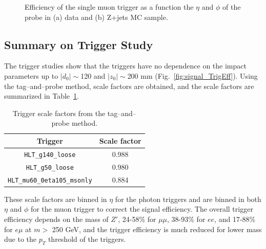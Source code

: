 \begin{figure}[!htb]
    \centering
    \caption{Efficiency of the single muon trigger as a function the $\eta$ and $\phi$ of the probe in (a) data and (b) Z+jets MC sample.}
    \label{fig:MuonTrigEff2D}
\end{figure}

\subsection{Summary on Trigger Study}
The trigger studies show that the triggers have no dependence on the impact parameters up to $|d_{0}|\sim$120 and $|z_{0}|\sim$200 mm (Fig.~\ref{fig:signal_TrigEff}). Using the tag--and--probe method, scale factors are obtained, and the scale factors are summarized in Table~\ref{table:trigger_scale_factor}.

\begin{table}[!htb]
	\centering
	\begin{tabular}{cc}
		\hline
		\hline
		Trigger                                     & Scale factor \\
		\hline
        \texttt{HLT\_g140\_loose}                   & 0.988 \\
        \texttt{HLT\_g50\_loose}                    & 0.980 \\
        \texttt{HLT\_mu60\_0eta105\_msonly}         & 0.884 \\
		\hline
		\hline
	\end{tabular}
	\caption{Trigger scale factors from the tag--and--probe method.}
	\label{table:trigger_scale_factor}
\end{table}
These scale factors are binned in $\eta$ for the photon triggers and are binned in both $\eta$ and $\phi$ for the muon trigger to correct the signal efficiency. The overall trigger efficiency depends on the mass of $Z'$, 24-58\% for $\mu\mu$, 38-93\% for $ee$, and 17-88\% for $e\mu$ at $m > $ 250 GeV, and the trigger efficiency is much reduced for lower mass due to the $p_{T}$ threshold of the triggers.


